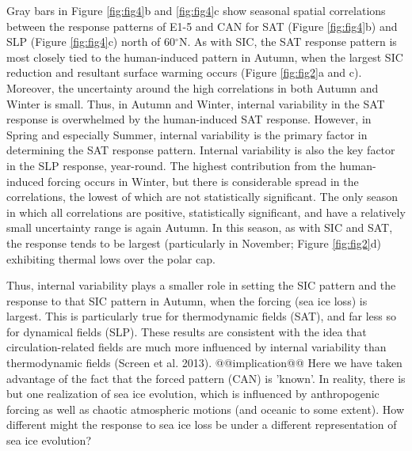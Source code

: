\documentclass[twocol]{ametsoc}
\begin{document}
Gray bars in Figure \ref{fig:fig4}b and \ref{fig:fig4}c show seasonal spatial correlations between the response patterns of E1-5 and CAN for SAT (Figure \ref{fig:fig4}b) and SLP (Figure \ref{fig:fig4}c) north of 60$^\circ$N. As with SIC, the SAT response pattern is most closely tied to the human-induced pattern in Autumn, when the largest SIC reduction and resultant surface warming occurs (Figure \ref{fig:fig2}a and c). Moreover, the uncertainty around the high correlations in both Autumn and Winter is small. Thus, in Autumn and Winter, internal variability in the SAT response is overwhelmed by the human-induced SAT response. However, in Spring and especially Summer, internal variability is the primary factor in determining the SAT response pattern. Internal variability is also the key factor in the SLP response, year-round. The highest contribution from the human-induced forcing occurs in Winter, but there is considerable spread in the correlations, the lowest of which are not statistically significant. The only season in which all correlations are positive, statistically significant, and have a relatively small uncertainty range is again Autumn. In this season, as with SIC and SAT, the response tends to be largest (particularly in November; Figure \ref{fig:fig2}d) exhibiting thermal lows over the polar cap.

Thus, internal variability plays a smaller role in setting the SIC pattern and the response to that SIC pattern in Autumn, when the forcing (sea ice loss) is largest. This is particularly true for thermodynamic fields (SAT), and far less so for dynamical fields (SLP). These results are consistent with the idea that circulation-related fields are much more influenced by internal variability than thermodynamic fields (Screen et al. 2013). @@implication@@ Here we have taken advantage of the fact that the forced pattern (CAN) is 'known'. In reality, there is but one realization of sea ice evolution, which is influenced by anthropogenic forcing as well as chaotic atmospheric motions (and oceanic to some extent). How different might the response to sea ice loss be under a different representation of sea ice evolution?
\end{document}
